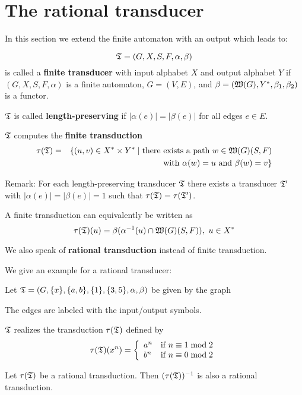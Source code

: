 \section{The rational transducer}

In this section we extend the finite automaton with an output which leads to:

\begin{definition}
\[ \mbox{$\mathfrak{T}$} = (G, X, S, F, \alpha, \beta) \] is called a {\bf finite transducer}
with input alphabet $X$ and output alphabet $Y$ if $(G, X, S, F, \alpha)$ is a
finite automaton, $G = (V, E)$, and $\beta = (\mbox{$\mathfrak{W}({G})$}, Y^*, \beta_1,
\beta_2)$ is a functor.
\end{definition}

$\mbox{$\mathfrak{T}$}$ is called {\bf length-preserving} if $|\alpha(e)| = |\beta(e)|$ for all
edges $e \in E$.

$\mbox{$\mathfrak{T}$}$ computes the {\bf finite transduction}
\begin{eqnarray*}
\tau(\mbox{$\mathfrak{T}$}) & = & \{ (u, v) \in X^* \times Y^* \mid \mbox{there
exists a path } w \in \mbox{$\mathfrak{W}({G})$}(S, F) \\
& &  \mbox{ with } \alpha(w) = u \mbox{ and } \beta(w) = v \}
\end{eqnarray*}

Remark: For each length-preserving transducer $\mbox{$\mathfrak{T}$}$ there exists a
transducer $\mbox{$\mathfrak{T'}$}$ with $|\alpha(e)| = |\beta(e)| = 1$ such that
$\tau(\mbox{$\mathfrak{T}$}) = \tau(\mbox{$\mathfrak{T'}$})$.

A finite transduction can equivalently be written as 
\[ \tau(\mbox{$\mathfrak{T}$})(u) = \beta(\alpha^{-1}(u) \cap \mbox{$\mathfrak{W}({G})$}(S, F)),\ u \in X^* \]

We also speak of {\bf rational transduction} instead of finite transduction.

We give an example for a rational transducer:

Let $\mbox{$\mathfrak{T}$} = (G, \mbox{$\{x\}$}, \mbox{$\{a, b\}$}, \mbox{$\{1\}$}, \mbox{$\{3, 5\}$}, \alpha,
\beta)$ be given by the graph

\missingfigure

The edges are labeled with the input/output symbols.

$\mbox{$\mathfrak{T}$}$ realizes the transduction $\tau(\mbox{$\mathfrak{T}$})$ defined by
\[ \tau(\fa{T})(x^n) = \left\{ 
\begin{array}{l@{\quad}l}
a^n & \mbox{if } n \equiv 1 \bmod 2 \\
b^n & \mbox{if } n \equiv 0 \bmod 2
\end{array}
\right. \]

\begin{lemma}
Let $\tau(\mbox{$\mathfrak{T}$})$ be a rational transduction. Then $(\tau(\mbox{$\mathfrak{T}$}))^{-1}$ is
also a rational transduction.
\end{lemma}

